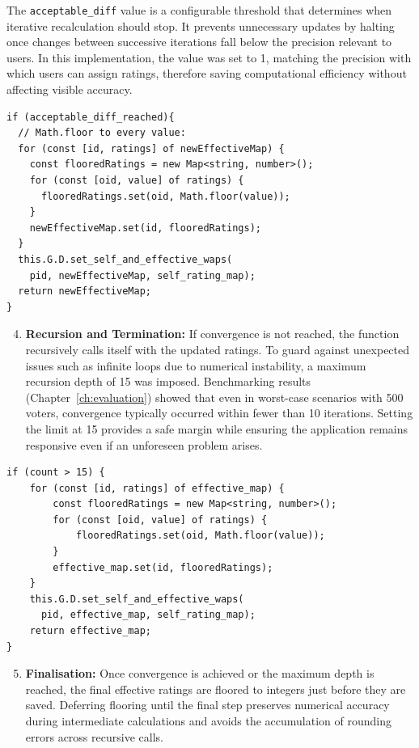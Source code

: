 The \texttt{acceptable\_diff} value is a configurable threshold that determines when iterative recalculation should stop. It prevents unnecessary updates by halting once changes between successive iterations fall below the precision relevant to users. In this implementation, the value was set to 1, matching the precision with which users can assign ratings, therefore saving computational efficiency without affecting visible accuracy.

\begin{verbatim}
if (acceptable_diff_reached){
  // Math.floor to every value:
  for (const [id, ratings] of newEffectiveMap) {
    const flooredRatings = new Map<string, number>();
    for (const [oid, value] of ratings) {
      flooredRatings.set(oid, Math.floor(value));
    }
    newEffectiveMap.set(id, flooredRatings);
  }
  this.G.D.set_self_and_effective_waps(
    pid, newEffectiveMap, self_rating_map);
  return newEffectiveMap;
}
\end{verbatim}

\begin{enumerate}
    \setcounter{enumi}{3}
    \item \textbf{Recursion and Termination:} If convergence is not reached, the function recursively calls itself with the updated ratings. To guard against unexpected issues such as infinite loops due to numerical instability, a maximum recursion depth of 15 was imposed. Benchmarking results (Chapter~\ref{ch:evaluation}) showed that even in worst-case scenarios with 500 voters, convergence typically occurred within fewer than 10 iterations. Setting the limit at 15 provides a safe margin while ensuring the application remains responsive even if an unforeseen problem arises.
\end{enumerate}

\begin{verbatim}
if (count > 15) {
    for (const [id, ratings] of effective_map) {
        const flooredRatings = new Map<string, number>();
        for (const [oid, value] of ratings) {
            flooredRatings.set(oid, Math.floor(value));
        }
        effective_map.set(id, flooredRatings);
    }
    this.G.D.set_self_and_effective_waps(
      pid, effective_map, self_rating_map);
    return effective_map;
}
\end{verbatim}

\begin{enumerate}
    \setcounter{enumi}{4}
    \item \textbf{Finalisation:} Once convergence is achieved or the maximum depth is reached, the final effective ratings are floored to integers just before they are saved. Deferring flooring until the final step preserves numerical accuracy during intermediate calculations and avoids the accumulation of rounding errors across recursive calls.
\end{enumerate}


